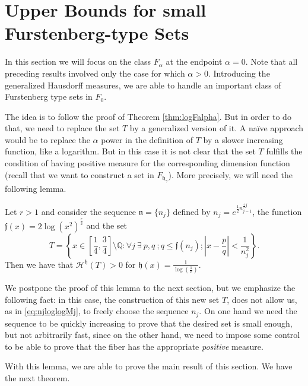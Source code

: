 \documentclass[11pt,a4paper]{amsart}
\begin{document}
\section{Upper Bounds for small Furstenberg-type Sets}\label{sec:gfurs}

In this section we will focus on the class $F_\alpha$ at the
endpoint $\alpha=0$. Note that all preceding results involved only the case for which $\alpha > 0$. Introducing the generalized Hausdorff measures, we are able to handle an important class of Furstenberg type sets in $F_0$. 

The idea is to follow the proof of Theorem \ref{thm:logFalpha}. But in order to do that, we need to replace the set $T$ by a generalized version of it. A na\"ive approach would be to replace the $\alpha$ power in the definition of $T$ by a slower increasing function, like a logarithm. But in this case it is not clear that the set $T$ fulfills the condition of having positive measure for the corresponding dimension function (recall that we want to construct a set in $F_{{\mathfrak{h}}_\gamma}$).  More precisely, we will need the following lemma.

\begin{lemma}\label{lem:fiber}
Let $r>1$ and consider the sequence ${\mathfrak{n}}=\{n_j\}$ defined by $n_j=e^{\frac{1}{2}n_{j-1}^{\frac{4}{r}j}}$, the function 
${\mathfrak{f}}(x)=2\log(x^2)^\frac{r}{2}$ and the set
\begin{equation*}
T=\left\{x\in\left[\frac{1}{4},\frac{3}{4}\right]\setminus {\mathbb{Q}}: \forall j \ \exists\ p,q\ ; q\le
{\mathfrak{f}}(n_j); |x-\frac{p}{q}|<\frac{1}{n_j^2}\right\}.
\end{equation*}
Then we have that ${\mathcal{H}^{{\mathfrak{h}}}}(T)>0$ for ${\mathfrak{h}}(x)=\frac{1}{\log(\frac{1}{x})}$.
\end{lemma}

\begin{remark}
We postpone the proof of this lemma to the next section, but we emphasize the following fact: in this  case, the construction of this new set $T$, does not allow us, as in \eqref{eq:njloglogMj}, to freely choose the sequence $n_j$. On one  hand we need the sequence to be quickly increasing to prove that the desired set is small enough, but not arbitrarily fast, since on the other hand, we need to impose some control to be able to prove that the fiber has the appropriate \emph{positive} measure. 
\end{remark}

 With this lemma, we are able to prove the main result of this section. We have the next theorem.
\end{document}
